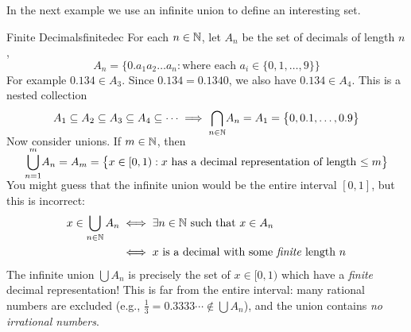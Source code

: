 

	

%

In the next example we use an infinite union to define an interesting set.

\begin{example}{Finite Decimals}{finitedec}
	For each $n\in\mathbb{N}$, let $A_n$ be the set of decimals of length $n$,
	\[
		A_n=\bigl\{0.a_1a_2\ldots a_n:\text{where each $a_i\in\{0,1,\ldots,9\}$}\bigr\}
	\]
	For example $0.134\in A_3$. Since $0.134=0.1340$, we also have $0.134\in A_4$. This is a nested collection
	\[
		A_1\subseteq A_2\subseteq A_3\subseteq A_4\subseteq\cdots 
		\implies \smash[b]{\bigcap_{n\in\mathbb{N}}}A_n=A_1=\bigl\{0,0.1,\ldots,0.9\bigr\}
	\]
	Now consider unions. If $m\in\mathbb{N}$, then
	\[
		\smash{\bigcup_{n=1}^m}A_n=A_m
		=\bigl\{x\in [0,1):x\text{ has a decimal representation of length $\le m$}\bigr\}
	\]
	You might guess that the infinite union would be the entire\footnotemark{} interval $[0,1]$, but this is incorrect:
	\begin{align*}
		x\in\bigcup_{n\in\mathbb{N}}A_n 
		&\iff\exists n\in\mathbb{N}\text{ such that }x\in A_n\\
		&\iff x\text{ is a decimal with some \emph{finite} length $n$}
	\end{align*}
	The infinite union $\bigcup A_n$ is precisely the set of $x\in[0,1)$ which have a \emph{finite} decimal representation! This is far from the entire interval: many rational numbers are excluded (e.g., $\frac 13=0.3333\cdots \notin\bigcup A_n$), and the union contains \emph{no irrational numbers}.
\end{example}

